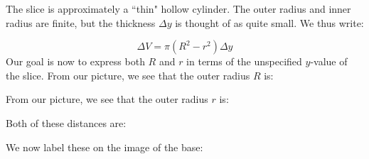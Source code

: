 \documentclass{ximera}
\begin{document}
The slice is approximately a ``thin" hollow cylinder.  The outer radius and inner radius are finite, but the thickness $\Delta y$ is thought of as quite small.  We thus write:

\[\Delta V = \pi(R^2-r^2) \Delta y \]
Our goal is now to express both $R$ and $r$ in terms of the unspecified $y$-value of the slice.  From our picture, we see that the outer radius $R$ is:

\begin{multipleChoice}
\end{multipleChoice}

From our picture, we see that the outer radius $r$ is:

\begin{multipleChoice}
\end{multipleChoice}

Both of these distances are:

\begin{multipleChoice}
\end{multipleChoice}

We now label these on the image of the base:
\end{document}
